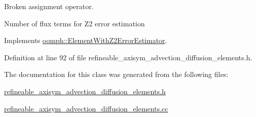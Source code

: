 Broken assignment operator. 

Number of \textquotesingle{}flux\textquotesingle{} terms for Z2 error estimation 

Implements \hyperlink{classoomph_1_1ElementWithZ2ErrorEstimator_ae82c5728902e13da31be19c390fc28e3}{oomph\+::\+Element\+With\+Z2\+Error\+Estimator}.



Definition at line 92 of file refineable\+\_\+axisym\+\_\+advection\+\_\+diffusion\+\_\+elements.\+h.



The documentation for this class was generated from the following files\+:\begin{DoxyCompactItemize}
\item 
\hyperlink{refineable__axisym__advection__diffusion__elements_8h}{refineable\+\_\+axisym\+\_\+advection\+\_\+diffusion\+\_\+elements.\+h}\item 
\hyperlink{refineable__axisym__advection__diffusion__elements_8cc}{refineable\+\_\+axisym\+\_\+advection\+\_\+diffusion\+\_\+elements.\+cc}\end{DoxyCompactItemize}
